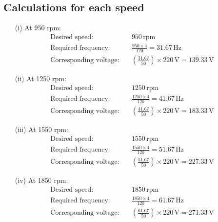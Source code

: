 \documentclass[12pt]{report}
\begin{document}
	\subsection*{Calculations for each speed}
	\begin{enumerate}
		\item[(i)] At 950 rpm:
		\begin{align*}
			\text{Desired speed:} & \quad 950 \, \text{rpm} \\
			\text{Required frequency:} & \quad \frac{950 \times 4}{120} = 31.67 \, \text{Hz} \\
			\text{Corresponding voltage:} & \quad \left(\frac{31.67}{50}\right) \times 220 \, \text{V} = 139.33 \, \text{V} 
		\end{align*}
		
		\item[(ii)] At 1250 rpm:
		\begin{align*}
			\text{Desired speed:} & \quad 1250 \, \text{rpm} \\
			\text{Required frequency:} & \quad \frac{1250 \times 4}{120} = 41.67 \, \text{Hz} \\
			\text{Corresponding voltage:} & \quad \left(\frac{41.67}{50}\right) \times 220 \, \text{V} = 183.33 \, \text{V}
		\end{align*}
		
		\item[(iii)] At 1550 rpm:
		\begin{align*}
			\text{Desired speed:} & \quad 1550 \, \text{rpm} \\
			\text{Required frequency:} & \quad \frac{1550 \times 4}{120} = 51.67 \, \text{Hz} \\
			\text{Corresponding voltage:} & \quad \left(\frac{51.67}{50}\right) \times 220 \, \text{V} = 227.33 \, \text{V}
		\end{align*}
		
		\item[(iv)] At 1850 rpm:
		\begin{align*}
			\text{Desired speed:} & \quad 1850 \, \text{rpm} \\
			\text{Required frequency:} & \quad \frac{1850 \times 4}{120} = 61.67 \, \text{Hz} \\
			\text{Corresponding voltage:} & \quad \left(\frac{61.67}{50}\right) \times 220 \, \text{V} = 271.33 \, \text{V}
		\end{align*}
		
	\end{enumerate}
	
	
\end{document}

